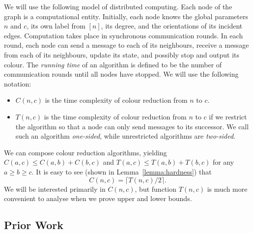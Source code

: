 \documentclass[a4paper,11pt]{article}
\theoremstyle{remark}
\begin{document}
We will use the following model of distributed computing. Each node of the graph is a computational entity. Initially, each node knows the global parameters $n$ and $c$, its own label from $[n]$, its degree, and the orientations of its incident edges. Computation takes place in synchronous communication rounds. In each round, each node can send a message to each of its neighbours, receive a message from each of its neighbours, update its state, and possibly stop and output its colour. The \emph{running time} of an algorithm is defined to be the number of communication rounds until all nodes have stopped. We will use the following notation:
\begin{itemize}
    \item $C(n,c)$ is the time complexity of colour reduction from $n$ to $c$.
    \item $T(n,c)$ is the time complexity of colour reduction from $n$ to $c$ if we restrict the algorithm so that a node can only send messages to its successor. We call such an algorithm \emph{one-sided}, while unrestricted algorithms are \emph{two-sided}.
\end{itemize}
We can compose colour reduction algorithms, yielding $C(a,c) \le C(a,b) + C(b,c)$ and $T(a,c) \le T(a,b) + T(b,c)$ for any $a \ge b \ge c$. It is easy to see (shown in Lemma~\ref{lemma:hardness}) that
\[
    C(n,c) = \lceil T(n,c)/2 \rceil.
\]
We will be interested primarily in $C(n,c)$, but function $T(n,c)$ is much more convenient to analyse when we prove upper and lower bounds.


\subsection{Prior Work}
\end{document}
